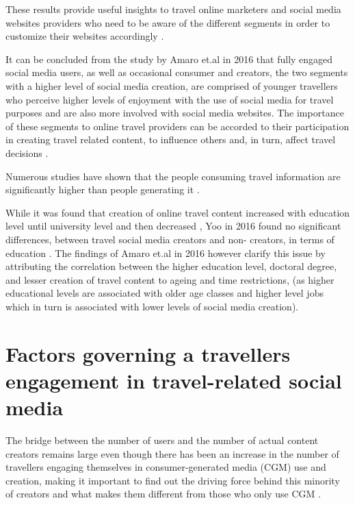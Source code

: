 These results provide useful insights to travel online marketers and social media websites providers who need to be aware of the different segments in order to customize their websites accordingly \cite{amaro2016travelers}.

It can be concluded from the study by Amaro et.al in 2016 that fully engaged social media users, as well as occasional consumer and creators, the two segments with a higher level of social media creation, are comprised of younger travellers who perceive higher levels of enjoyment with the use of social media for travel purposes and are also more involved with social media websites. The importance of these segments to online travel providers can be accorded to their participation in creating travel related content, to influence others and, in turn, affect travel decisions \cite{amaro2016travelers}.

Numerous studies have shown that the people consuming travel information are significantly higher than people generating it \cite{pan2012theoretical} \cite{YOO2011609}.  

While it was found that creation of online travel content increased with education level until university level and then decreased  \cite{ip2012profiling}, Yoo in 2016 found no significant differences, between travel social media creators and non- creators, in terms of education \cite{yoo2016use}. The findings of Amaro et.al in 2016 however clarify this issue by attributing the correlation between the higher education level, doctoral degree, and lesser creation of travel content to ageing and time restrictions, (as higher educational levels are associated with older age classes and higher level jobs which in turn is associated with lower levels of social media creation)\cite{amaro2016travelers}. 

		


\section{Factors governing a traveller\textquotesingle s engagement in travel-related social media}\label{2}
The bridge between the number of users and the number of actual content creators remains large even though there has been an increase in the number of travellers engaging themselves in consumer-generated media (CGM) use and creation, making it important to find out the driving force behind this minority of creators and what makes them different from those who only use CGM \cite{yoo2011influence}. 

